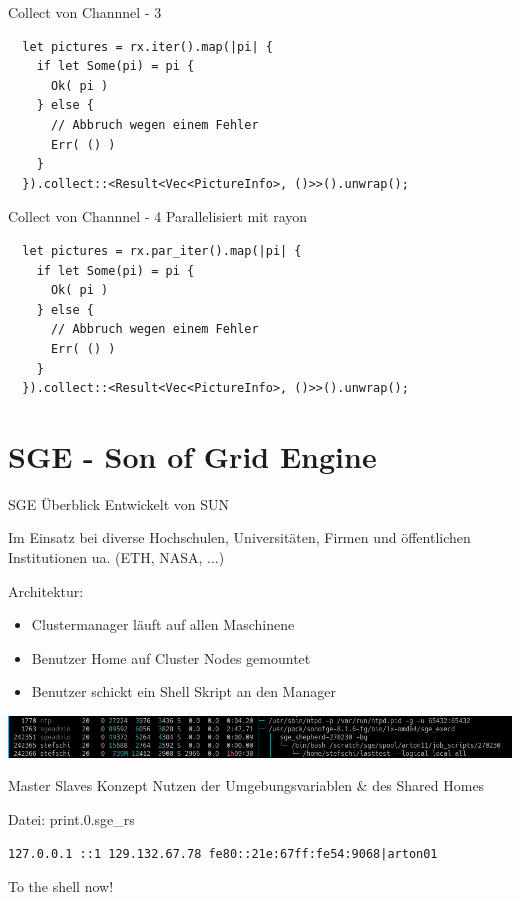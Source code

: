 \documentclass[aspectratio=1610,t]{beamer}
\begin{document}
\begin{frame}[fragile]{Collect von Channnel - 3}
\begin{verbatim}
  let pictures = rx.iter().map(|pi| {
    if let Some(pi) = pi {
      Ok( pi )
    } else {
      // Abbruch wegen einem Fehler
      Err( () )
    }
  }).collect::<Result<Vec<PictureInfo>, ()>>().unwrap();
\end{verbatim}
\end{frame}

\begin{frame}[fragile]{Collect von Channnel - 4}
Parallelisiert mit rayon
\begin{verbatim}
  let pictures = rx.par_iter().map(|pi| {
    if let Some(pi) = pi {
      Ok( pi )
    } else {
      // Abbruch wegen einem Fehler
      Err( () )
    }
  }).collect::<Result<Vec<PictureInfo>, ()>>().unwrap();
\end{verbatim}
\end{frame}


{
\section{SGE - Son of Grid Engine}
}
\begin{frame}[fragile]{SGE Überblick}
Entwickelt von SUN

Im Einsatz bei diverse Hochschulen, Universitäten, Firmen und öffentlichen Institutionen ua. (ETH, NASA, ...)

Architektur:
\begin{itemize}
    \item Clustermanager läuft auf allen Maschinene
    \item Benutzer Home auf Cluster Nodes gemountet
    \item Benutzer schickt ein Shell Skript an den Manager
\end{itemize}
\includegraphics[width=14cm]{Screenshot_SGE_Call.png}
\end{frame}

\begin{frame}[fragile]{Master Slaves Konzept}
Nutzen der Umgebungsvariablen \& des Shared Homes

Datei: print.0.sge\_rs
\begin{verbatim}
127.0.0.1 ::1 129.132.67.78 fe80::21e:67ff:fe54:9068|arton01
\end{verbatim}

To the shell now!
\end{frame}
\end{document}
